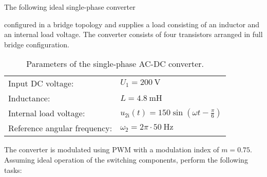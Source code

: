 

The following ideal single-phase converter
 

configured in a bridge topology and supplies a load consisting of an inductor and an internal load voltage. The converter consists
of four transistors arranged in full bridge configuration.

\begin{table}[ht]
    \centering  %
    \begin{tabular}{ll}
        \toprule
        Input DC voltage: & $U_{\mathrm{1}}=\SI{200}{\volt}$ \\
        Inductance: & $L = \SI{4.8}{\milli \henry}$ \\
        Internal load voltage: & $u_{2\mathrm{i}}(t) = 150 \sin(\omega t - \frac{\pi}{6})$ \\ 
        Reference angular frequency: & $\omega_2 = 2\pi \cdot \SI{50}{\hertz}$ \\ 
        \bottomrule
    \end{tabular}
    \caption{Parameters of the single-phase AC-DC converter.}  
    \label{table:ex07_Task1_ParametersOfTheCircuit}
\end{table}
The converter is modulated using PWM with a modulation index of $m=0.75$.  Assuming ideal operation of the switching components, perform the following tasks:

